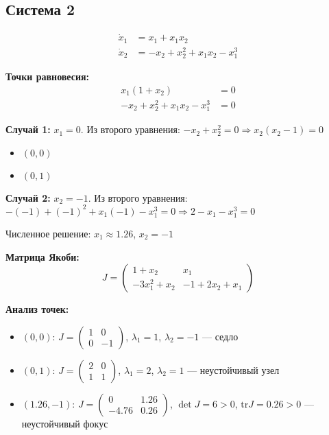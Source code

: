 \subsection*{Система 2}

\begin{align}
\dot{x}_1 &= x_1 + x_1 x_2 \\
\dot{x}_2 &= -x_2 + x_2^2 + x_1 x_2 - x_1^3
\end{align}

\textbf{Точки равновесия:}
\begin{align}
x_1(1 + x_2) &= 0 \\
-x_2 + x_2^2 + x_1 x_2 - x_1^3 &= 0
\end{align}

\textbf{Случай 1:} $x_1 = 0$. Из второго уравнения: $-x_2 + x_2^2 = 0 \Rightarrow x_2(x_2 - 1) = 0$
\begin{itemize}
\item $(0, 0)$
\item $(0, 1)$
\end{itemize}

\textbf{Случай 2:} $x_2 = -1$. Из второго уравнения: $-(-1) + (-1)^2 + x_1(-1) - x_1^3 = 0 \Rightarrow 2 - x_1 - x_1^3 = 0$

Численное решение: $x_1 \approx 1.26$, $x_2 = -1$

\textbf{Матрица Якоби:}
$$J = \begin{pmatrix} 1 + x_2 & x_1 \\ -3x_1^2 + x_2 & -1 + 2x_2 + x_1 \end{pmatrix}$$

\textbf{Анализ точек:}
\begin{itemize}
\item $(0, 0)$: $J = \begin{pmatrix} 1 & 0 \\ 0 & -1 \end{pmatrix}$, $\lambda_1 = 1$, $\lambda_2 = -1$ --- седло
\item $(0, 1)$: $J = \begin{pmatrix} 2 & 0 \\ 1 & 1 \end{pmatrix}$, $\lambda_1 = 2$, $\lambda_2 = 1$ --- неустойчивый узел
\item $(1.26, -1)$: $J = \begin{pmatrix} 0 & 1.26 \\ -4.76 & 0.26 \end{pmatrix}$, $\det J = 6 > 0$, $\text{tr} J = 0.26 > 0$ --- неустойчивый фокус
\end{itemize}
